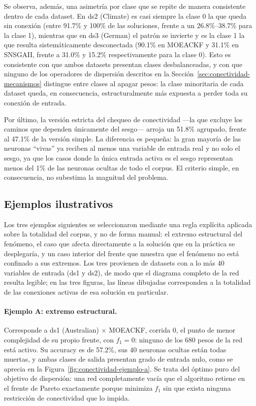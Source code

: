 Se observa, además, una asimetría por clase que se repite de manera consistente dentro de cada dataset. En ds2 (Climate) es casi siempre la clase 0 la que queda sin conexión (entre 91.7\% y 100\% de las soluciones, frente a un 26.8\%--38.7\% para la clase 1), mientras que en ds3 (German) el patrón se invierte y es la clase 1 la que resulta sistemáticamente desconectada (90.1\% en MOEACKF y 31.1\% en SNSGAII, frente a 31.0\% y 15.2\% respectivamente para la clase 0). Esto es consistente con que ambos datasets presentan clases desbalanceadas, y con que ninguno de los operadores de dispersión descritos en la Sección~\ref{sec:conectividad-mecanismos} distingue entre clases al apagar pesos: la clase minoritaria de cada dataset queda, en consecuencia, estructuralmente más expuesta a perder toda su conexión de entrada.

Por último, la versión estricta del chequeo de conectividad —la que excluye los caminos que dependen únicamente del sesgo— arroja un 51.8\% agrupado, frente al 47.1\% de la versión simple. La diferencia es pequeña: la gran mayoría de las neuronas ``vivas'' ya reciben al menos una variable de entrada real y no solo el sesgo, ya que los casos donde la única entrada activa es el sesgo representan menos del 1\% de las neuronas ocultas de todo el corpus. El criterio simple, en consecuencia, no subestima la magnitud del problema.

\subsection{Ejemplos ilustrativos}
\label{sec:conectividad-ejemplos}

Los tres ejemplos siguientes se seleccionaron mediante una regla explícita aplicada sobre la totalidad del corpus, y no de forma manual: el extremo estructural del fenómeno, el caso que afecta directamente a la solución que en la práctica se desplegaría, y un caso interior del frente que muestra que el fenómeno no está confinado a sus extremos. Los tres provienen de datasets con a lo más 40 variables de entrada (ds1 y ds2), de modo que el diagrama completo de la red resulta legible; en las tres figuras, las líneas dibujadas corresponden a la totalidad de las conexiones activas de esa solución en particular.

\paragraph{Ejemplo A: extremo estructural.}
Corresponde a ds1 (Australian) $\times$ MOEACKF, corrida 0, el punto de menor complejidad de su propio frente, con $f_1 = 0$: ninguno de los 680 pesos de la red está activo. Su accuracy es de 57.2\%, sus 40 neuronas ocultas están todas muertas, y ambas clases de salida presentan grado de entrada nulo, como se aprecia en la Figura~\ref{fig:conectividad-ejemplo-a}. Se trata del óptimo puro del objetivo de dispersión: una red completamente vacía que el algoritmo retiene en el frente de Pareto exactamente porque minimiza $f_1$ sin que exista ninguna restricción de conectividad que lo impida.

